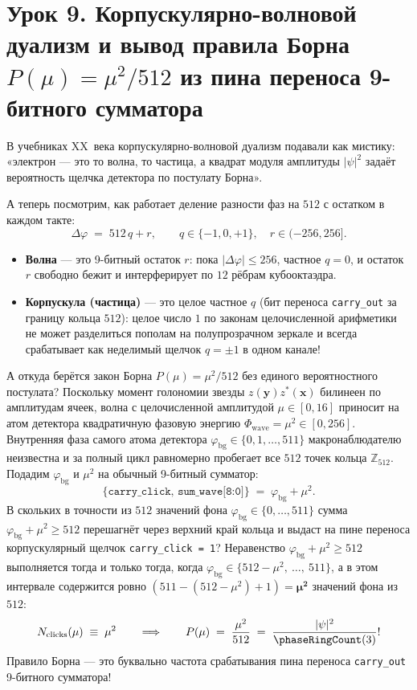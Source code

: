 \section{Урок 9. Корпускулярно-волновой дуализм и вывод правила Борна \texorpdfstring{$P(\mu) = \mu^2 / 512$}{P(mu) = mu\^2 / 512} из пина переноса 9-битного сумматора}

В учебниках XX~века корпускулярно-волновой дуализм подавали как мистику: «электрон --- это то волна, то частица, а квадрат модуля амплитуды $|\psi|^2$ задаёт вероятность щелчка детектора по постулату Борна».

А теперь посмотрим, как работает деление разности фаз на $512$ с остатком в каждом такте:
\[
  \Delta\varphi \;=\; 512\,q + r, \qquad q\in\{-1,0,+1\},\quad r\in(-256,256].
\]
\begin{itemize}[noitemsep]
\item \textbf{Волна} --- это 9-битный остаток $r$: пока $|\Delta\varphi|\le 256$, частное $q = 0$, и остаток $r$ свободно бежит и интерферирует по $12$ рёбрам кубооктаэдра.
\item \textbf{Корпускула (частица)} --- это целое частное $q$ (бит переноса \texttt{carry\_out} за границу кольца $512$): целое число $1$ по законам целочисленной арифметики не может разделиться пополам на полупрозрачном зеркале и всегда срабатывает как неделимый щелчок $q = \pm 1$ в одном канале!
\end{itemize}

А откуда берётся закон Борна $P(\mu) = \mu^2 / 512$ без единого вероятностного постулата? Поскольку момент голономии звезды $z(\mathbf{y})z^*(\mathbf{x})$ билинеен по амплитудам ячеек, волна с целочисленной амплитудой $\mu\in[0,16]$ приносит на атом детектора квадратичную фазовую энергию $\Phi_{\mathrm{wave}} = \mu^2\in[0,256]$. Внутренняя фаза самого атома детектора $\varphi_{\mathrm{bg}}\in\{0,1,\dots,511\}$ макронаблюдателю неизвестна и за полный цикл равномерно пробегает все $512$ точек кольца $\mathbb{Z}_{512}$. Подадим $\varphi_{\mathrm{bg}}$ и $\mu^2$ на обычный 9-битный сумматор:
\[
  \texttt{\{carry\_click, sum\_wave[8:0]\}} \;=\; \varphi_{\mathrm{bg}} + \mu^2.
\]
В скольких в точности из $512$ значений фона $\varphi_{\mathrm{bg}}\in\{0,\dots,511\}$ сумма $\varphi_{\mathrm{bg}} + \mu^2 \ge 512$ перешагнёт через верхний край кольца и выдаст на пине переноса корпускулярный щелчок \texttt{carry\_click = 1}? Неравенство $\varphi_{\mathrm{bg}} + \mu^2 \ge 512$ выполняется тогда и только тогда, когда $\varphi_{\mathrm{bg}} \in \{512 - \mu^2,\ \dots,\ 511\}$, а в этом интервале содержится ровно $(511 - (512 - \mu^2) + 1) = \mathbf{\mu^2}$ значений фона из $512$:
\begin{equation}
  \label{eq:course-born}
  N_{\mathrm{clicks}}(\mu) \;\equiv\; \mu^2
  \qquad\Longrightarrow\qquad
  P(\mu) \;=\; \frac{\mu^2}{512} \;=\; \frac{|\psi|^2}{\phaseRingCount(3)}!
\end{equation}
Правило Борна --- это буквально частота срабатывания пина переноса \texttt{carry\_out} 9-битного сумматора!

